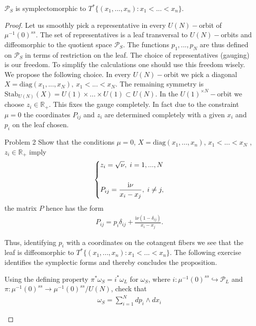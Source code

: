 \documentclass[10pt,a4paper]{amsart}
\newcommand {\ii} {\mathrm{i}}
\begin{document}
\begin{pr}
    $\mathcal{P}_{S}$ is symplectomorphic to $T^{*}\{(x_1 , ..., x_n ): x_1 < ... < x_n \}$.
\end{pr}

\begin{proof}
Let us smoothly pick a representative in every $U(N)-$orbit of $\mu^{-1}(0)^{ss}$. The set of representatives is a leaf transversal to $U(N)-$orbits and diffeomorphic to the quotient space $\mathcal{P}_{S}$. The functions $p_1, ..., p_N$ are thus defined on $\mathcal{P}_{S}$ in terms of restriction on the leaf. The choice of representatives (gauging) is our freedom. To simplify the calculations one should use this freedom wisely. We propose the following choice. In every $U(N)-$orbit we pick a diagonal $X = \mathrm{diag}(x_1, ..., x_N ), ~ x_1 < ... < x_N$.
The remaining symmetry is $\mathrm{Stab}_{U(N)}(X) = U(1) \times ... \times U(1) \subset U(N)$.
In the $U(1)^{\times N}-$orbit we choose $z_i \in \mathbb{R}_{+}$. This fixes the gauge completely. In fact due to the constraint $\mu = 0$ the coordinates $P_{ij}$ and $z_i$ are determined completely with a given $x_i$ and $p_i$ on the leaf chosen.
\begin{statement}{Problem 2}\normalfont\label{prob2}
Show that the conditions $\mu = 0$, $X = \mathrm{diag}(x_1, ..., x_n)$, $x_1 < ... <x_N$ , $z_i \in \mathbb{R}_{+}$ imply
\begin{align*}
\begin{dcases}
        z_i = \sqrt{\nu}, \;i = 1, ..., N\\\\
        P_{ij} = \frac{{\ii}\nu}{x_i - x_j}, \;i \neq j,
    \end{dcases} 
\end{align*}
the matrix $P$ hence has the form
\begin{align}\label{Pmatrix}
    P_{ij} = p_{i} \delta_{ij} + \frac{{\ii}\nu (1 - \delta_{ij})}{x_i - x_j}.
\end{align}
\end{statement}
Thus, identifying $p_i$ with a coordinates on the cotangent fibers we see that the leaf is diffeomorphic to $T^{*}\{(x_1 , ..., x_n ): x_1 < ... < x_n \}$. The following exercise identifies the symplectic forms and thereby concludes the proposition.
\begin{exer}\normalfont
    Using the defining property $\pi^{*}\omega_{S} = i^{*}\omega_{L}$ for $\omega_{S}$, where $i: \mu^{-1}(0)^{ss} \hookrightarrow \mathcal{P}_{L}$ and $\pi: \mu^{-1}(0)^{ss} \rightarrow \mu^{-1}(0)^{ss}/U(N)$, check that
    \begin{align*}
        \omega_{S} = \sum\limits_{i = 1}^{N} d p_{i} \wedge d x_{i}
    \end{align*}
\end{exer}
\end{proof}
\end{document}
